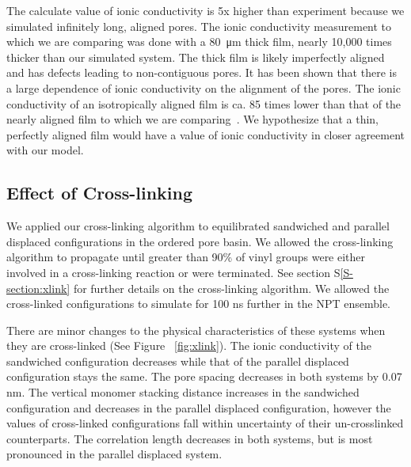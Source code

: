 \documentclass[journal=jpcbfk,manusciprt=article]{achemso}
\begin{document}
  The calculate value of ionic conductivity is 5x higher than experiment because 
  we simulated infinitely long, aligned pores. The ionic conductivity measurement 
  to which we are comparing was done with a \SI{80}{\micro\metre} thick film, 
  nearly 10,000 times thicker than our simulated
  system. The thick film is likely imperfectly aligned and has defects leading to
  non-contiguous pores. It has been shown that there is a large dependence of 
  ionic conductivity on the alignment of the pores. The ionic conductivity of an
  isotropically aligned film is ca. 85 times lower than that of the nearly aligned
  film to which we are comparing~\cite{feng_scalable_2014}. We hypothesize that a 
  thin, perfectly aligned film would have a value of ionic conductivity in closer
  agreement with our model.

  \subsection{Effect of Cross-linking}\label{section:xlink}

  We applied our cross-linking algorithm to equilibrated sandwiched and parallel
  displaced configurations in the ordered pore basin. We allowed the cross-linking
  algorithm to propagate until greater than 90\% of vinyl groups were either involved
  in a cross-linking reaction or were terminated. See section S\ref{S-section:xlink}
  for further details on the cross-linking algorithm. We allowed the cross-linked
  configurations to simulate for 100 ns further in the NPT ensemble. 

  There are minor changes to the physical characteristics of these systems when 
  they are cross-linked (See Figure ~\ref{fig:xlink}). The ionic conductivity of 
  the sandwiched configuration decreases while that of the parallel displaced 
  configuration stays the same. The pore spacing decreases in both systems by
  0.07 nm. The vertical monomer stacking distance increases in the sandwiched
  configuration and decreases in the parallel displaced configuration, however the 
  values of cross-linked configurations fall within uncertainty of their un-crosslinked
  counterparts. The correlation length decreases in both systems, 
but is most pronounced in the parallel displaced system.  
  
\end{document}
